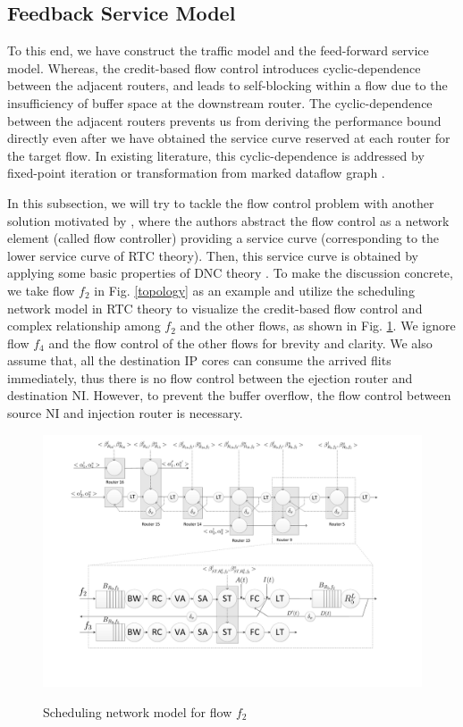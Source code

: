 \documentclass[preprint]{elsarticle}
\begin{document}
\subsection{Feedback Service Model}\label{flowcontrol}
To this end, we have construct the traffic model and the feed-forward service model. Whereas, the credit-based flow control introduces cyclic-dependence between the adjacent routers, and leads to self-blocking within a flow due to the insufficiency of buffer space at the downstream router. The cyclic-dependence between the adjacent routers prevents us from deriving the performance bound directly even after we have obtained the service curve reserved at each router for the target flow. In existing literature, this cyclic-dependence is addressed by fixed-point iteration \cite{schioler2005network} or transformation from marked dataflow graph \cite{Thiele:2009:MPA:1629335.1629353}.

In this subsection, we will try to tackle the flow control problem with another solution motivated by \cite{qian2009analysis}, where the authors abstract the flow control as a network element (called flow controller) providing a service curve (corresponding to the lower service curve of RTC theory). Then, this service curve is obtained by applying some basic properties of DNC theory \cite{Boudec2001Network}. To make the discussion concrete, we take flow $f_2$ in Fig. \ref{topology} as an example and utilize the scheduling network model \cite{1253607} in RTC theory to visualize the credit-based flow control and complex relationship among $f_2$ and the other flows, as shown in Fig. \ref{f2}. We ignore flow $f_4$ and the flow control of the other flows for brevity and clarity. We also assume that, all the destination IP cores can consume the arrived flits immediately, thus there is no flow control between the ejection router and destination NI. However, to prevent the buffer overflow, the flow control between source NI and injection router is necessary.
\begin{figure}
  \centering
  \includegraphics[scale=0.35]{figures/f2.pdf}\\
  \caption{Scheduling network model for flow $f_2$}\label{f2}
\end{figure}
\end{document}

